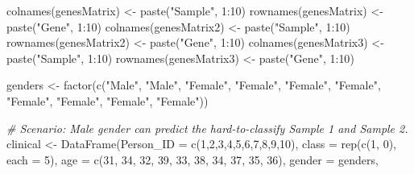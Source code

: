 \documentclass[
]{article}
\newenvironment{Shaded}{\begin{snugshade}}{\end{snugshade}}
\newcommand{\AttributeTok}[1]{\textcolor[rgb]{0.77,0.63,0.00}{#1}}
\newcommand{\CommentTok}[1]{\textcolor[rgb]{0.56,0.35,0.01}{\textit{#1}}}
\newcommand{\DecValTok}[1]{\textcolor[rgb]{0.00,0.00,0.81}{#1}}
\newcommand{\FunctionTok}[1]{\textcolor[rgb]{0.00,0.00,0.00}{#1}}
\newcommand{\NormalTok}[1]{#1}
\newcommand{\OtherTok}[1]{\textcolor[rgb]{0.56,0.35,0.01}{#1}}
\newcommand{\SpecialCharTok}[1]{\textcolor[rgb]{0.00,0.00,0.00}{#1}}
\newcommand{\StringTok}[1]{\textcolor[rgb]{0.31,0.60,0.02}{#1}}
\begin{document}
\begin{Shaded}
\begin{Highlighting}[]
  \FunctionTok{colnames}\NormalTok{(genesMatrix) }\OtherTok{\textless{}{-}} \FunctionTok{paste}\NormalTok{(}\StringTok{"Sample"}\NormalTok{, }\DecValTok{1}\SpecialCharTok{:}\DecValTok{10}\NormalTok{)}
  \FunctionTok{rownames}\NormalTok{(genesMatrix) }\OtherTok{\textless{}{-}} \FunctionTok{paste}\NormalTok{(}\StringTok{"Gene"}\NormalTok{, }\DecValTok{1}\SpecialCharTok{:}\DecValTok{10}\NormalTok{)}
    \FunctionTok{colnames}\NormalTok{(genesMatrix2) }\OtherTok{\textless{}{-}} \FunctionTok{paste}\NormalTok{(}\StringTok{"Sample"}\NormalTok{, }\DecValTok{1}\SpecialCharTok{:}\DecValTok{10}\NormalTok{)}
  \FunctionTok{rownames}\NormalTok{(genesMatrix2) }\OtherTok{\textless{}{-}} \FunctionTok{paste}\NormalTok{(}\StringTok{"Gene"}\NormalTok{, }\DecValTok{1}\SpecialCharTok{:}\DecValTok{10}\NormalTok{)}
      \FunctionTok{colnames}\NormalTok{(genesMatrix3) }\OtherTok{\textless{}{-}} \FunctionTok{paste}\NormalTok{(}\StringTok{"Sample"}\NormalTok{, }\DecValTok{1}\SpecialCharTok{:}\DecValTok{10}\NormalTok{)}
  \FunctionTok{rownames}\NormalTok{(genesMatrix3) }\OtherTok{\textless{}{-}} \FunctionTok{paste}\NormalTok{(}\StringTok{"Gene"}\NormalTok{, }\DecValTok{1}\SpecialCharTok{:}\DecValTok{10}\NormalTok{)}
  
\NormalTok{  genders }\OtherTok{\textless{}{-}} \FunctionTok{factor}\NormalTok{(}\FunctionTok{c}\NormalTok{(}\StringTok{"Male"}\NormalTok{, }\StringTok{"Male"}\NormalTok{, }\StringTok{"Female"}\NormalTok{, }\StringTok{"Female"}\NormalTok{, }\StringTok{"Female"}\NormalTok{,}
                    \StringTok{"Female"}\NormalTok{, }\StringTok{"Female"}\NormalTok{, }\StringTok{"Female"}\NormalTok{, }\StringTok{"Female"}\NormalTok{, }\StringTok{"Female"}\NormalTok{))}

  \CommentTok{\# Scenario: Male gender can predict the hard{-}to{-}classify Sample 1 and Sample 2.}
\NormalTok{  clinical }\OtherTok{\textless{}{-}} \FunctionTok{DataFrame}\NormalTok{(}\AttributeTok{Person\_ID =} \FunctionTok{c}\NormalTok{(}\DecValTok{1}\NormalTok{,}\DecValTok{2}\NormalTok{,}\DecValTok{3}\NormalTok{,}\DecValTok{4}\NormalTok{,}\DecValTok{5}\NormalTok{,}\DecValTok{6}\NormalTok{,}\DecValTok{7}\NormalTok{,}\DecValTok{8}\NormalTok{,}\DecValTok{9}\NormalTok{,}\DecValTok{10}\NormalTok{),}
                        \AttributeTok{class =} \FunctionTok{rep}\NormalTok{(}\FunctionTok{c}\NormalTok{(}\DecValTok{1}\NormalTok{, }\DecValTok{0}\NormalTok{), }\AttributeTok{each =} \DecValTok{5}\NormalTok{),}
    \AttributeTok{age =} \FunctionTok{c}\NormalTok{(}\DecValTok{31}\NormalTok{, }\DecValTok{34}\NormalTok{, }\DecValTok{32}\NormalTok{, }\DecValTok{39}\NormalTok{, }\DecValTok{33}\NormalTok{, }\DecValTok{38}\NormalTok{, }\DecValTok{34}\NormalTok{, }\DecValTok{37}\NormalTok{, }\DecValTok{35}\NormalTok{, }\DecValTok{36}\NormalTok{),}
                        \AttributeTok{gender =}\NormalTok{ genders,}
                        

\end{Highlighting}
\end{Shaded}
\end{document}

